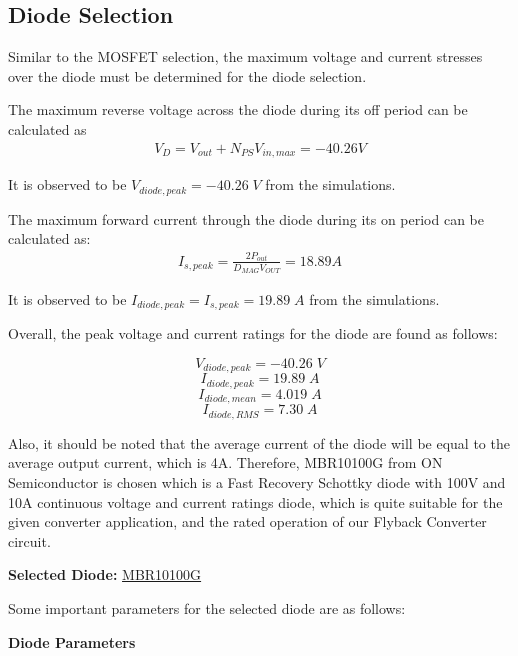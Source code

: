 \subsection{Diode Selection}
Similar to the MOSFET selection, the maximum voltage and current stresses over the diode must be determined for the diode selection.

The maximum reverse voltage across the diode during its off period can be calculated as
\begin{align*}
    V_D=V_{out}+N_{PS}V_{in,max}=-40.26V
\end{align*}

It is observed to be $ V_{diode,peak} = -40.26\;V $ from the simulations.

The maximum forward current through the diode during its on period can be calculated as:
\begin{align*}
    I_{s,peak}=\frac{2P_{out}}{D_{MAG}V_{OUT}}=18.89A
\end{align*} 

It is observed to be $ I_{diode,peak} = I_{s,peak} = 19.89\;A $ from the simulations.

Overall, the peak voltage and current ratings for the diode are found as follows:

$$ V_{diode,peak} = -40.26\;V $$
$$ I_{diode,peak} = 19.89\;A $$
$$ I_{diode,mean} = 4.019\;A $$
$$ I_{diode,RMS} = 7.30\;A $$

Also, it should be noted that the average current of the diode will be equal to the average output current, which is 4A. Therefore, MBR10100G from ON Semiconductor is chosen which is a Fast Recovery Schottky diode with 100V and 10A continuous voltage and current ratings diode, which is quite suitable for the given converter application, and the rated operation of our Flyback Converter circuit.

\textbf{Selected Diode: } \href{https://www.onsemi.com/pub/Collateral/MBR1080-D.PDF}{MBR10100G}

Some important parameters for the selected diode are as follows:

\textbf{Diode Parameters}

